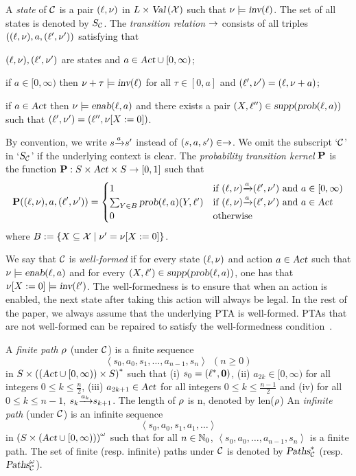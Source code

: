 A \emph{state} of $\mathcal{C}$ is a pair $(\ell, \nu)$ in $L\times\mbox{\sl Val}\left(\mathcal{X}\right)$ such that $\nu\models \mbox{\sl inv}(\ell)$.
The set of all states is denoted by $S_{\mathcal{C}}$.
The \emph{transition relation} $\rightarrow$ consists of all triples $((\ell,\nu),a,(\ell',\nu'))$ satisfying that
\begin{compactitem}
\item $(\ell,\nu), (\ell',\nu')$ are states and $a\in\mbox{\sl Act}\cup [0,\infty)$;
\item if $a\in [0,\infty)$ then $\nu+\tau\models \mbox{\sl inv}(\ell)$ for all $\tau\in [0, a]$ and $(\ell',\nu')=(\ell,\nu+a)$;
\item if $a\in\mbox{\sl Act}$ then $\nu\models\mbox{\sl enab}(\ell,a)$ and there exists a pair $(X, \ell'')\in{\mbox{\sl supp}}(\mbox{\sl prob}(\ell,a))$ such that $(\ell',\nu')=(\ell'',{\nu}{\left[X:=0\right]})$.
\end{compactitem}
By convention, we write ${s}{\xrightarrow{a}}{s'}$ instead of $(s,a,s')\in\rightarrow$.
We omit the subscript `$\mathcal{C}$' in `$S_{\mathcal{C}}$' if the underlying context is clear.
The \emph{probability transition kernel} $\mathbf{P}$ is the function $\mathbf{P}:S\times\mbox{\sl Act}\times S\rightarrow[0,1]$ such that
\[
\mathbf{P}((\ell,\nu),a,(\ell',\nu'))=\begin{cases}
1 & \mbox{if }{(\ell,\nu)}{\xrightarrow{a}}{(\ell',\nu')}\mbox{ and } a\in [0,\infty)\\
\sum_{Y\in B}\mbox{\sl prob}(\ell,a)(Y,\ell') & \mbox{if }{(\ell,\nu)}{\xrightarrow{a}}{(\ell',\nu')}\mbox{ and } a\in\mbox{\sl Act} \\
0 & \mbox{otherwise}
\end{cases}
\]
where $B:=\{X\subseteq\mathcal{X}\mid \nu'={\nu}{\left[X:=0\right]}\}$.

 We say that $\mathcal{C}$ is \emph{well-formed} if for every state $(\ell,\nu)$ and action $a\in\mbox{\sl Act}$ such that $\nu\models\mbox{\sl enab}(\ell,a)$ and for every $(X,\ell')\in {\mbox{\sl supp}}(\mbox{\sl prob}(\ell,a))$, one has that ${\nu}{\left[X:=0\right]}\models\mbox{\sl inv}(\ell')$.
The well-formedness is to ensure that when an action is enabled, the next state after taking this action will always be legal. In the rest of the paper, we always assume that the underlying PTA is well-formed. PTAs that are not well-formed can be repaired to satisfy the well-formedness condition~\cite{DBLP:journals/iandc/KwiatkowskaNSW07}.

A \emph{finite path} $\rho$ (under $\mathcal{C}$) is a finite sequence
\[
\left\langle s_0,a_0,s_1,\dots,a_{n-1},s_n\right\rangle~~(n\ge 0)
\]
in $S\times{\left((\mbox{\sl Act}\cup[0,\infty))\times S\right)}^*$
such that (i) $s_0=(\ell^*,\mathbf{0})$,
(ii) $a_{2k}\in [0,\infty)$ for all integers $0\le k\le \frac{n}{2}$, (iii) $a_{2k+1}\in \mbox{\sl Act}$ for all integers $0\le k\le \frac{n-1}{2}$ and (iv) for all $0\le k\le n-1$, ${s_k}{\xrightarrow{a_k}}{s_{k+1}}$.
The length of $\rho$ is n, denoted by len($\rho$)
An \emph{infinite path} (under $\mathcal{C}$) is an infinite sequence
\[
\left\langle s_0,a_0,s_1,a_1,\dots\right\rangle
\]
in ${\left(S\times(\mbox{\sl Act}\cup[0,\infty))\right)}^\omega$
such that for all $n\in\mathbb{N}_0$, $\left\langle s_0,a_0,\dots,a_{n-1},s_n\right\rangle$ is a finite path.
The set of finite (resp. infinite) paths  under $\mathcal{C}$ is denoted by $\mbox{\sl Paths}^*_{\mathcal{C}}$ (resp. $\mbox{\sl Paths}^\omega_{\mathcal{C}}$).



